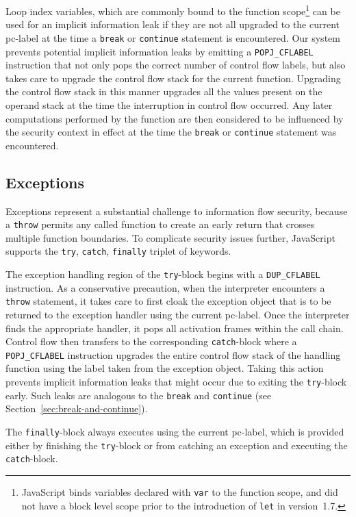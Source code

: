 \documentclass[preprint]{sigplanconf}
\begin{document}
Loop index variables, which are commonly bound to the function scope\footnote{JavaScript binds variables declared with \texttt{var} to the function scope, and did not have a block level scope prior to the introduction of \texttt{let} in version~1.7.} can be used for an implicit information leak if they are not all upgraded to the current pc-label at the time a \texttt{break} or \texttt{continue} statement is encountered.
Our system prevents potential implicit information leaks by emitting a \texttt{POPJ\_CFLABEL} instruction that not only pops the correct number of control flow labels, but also takes care to upgrade the control flow stack for the current function.
Upgrading the control flow stack in this manner upgrades all the values present on the operand stack at the time the interruption in control flow occurred.
Any later computations performed by the function are then considered to be influenced by the security context in effect at the time the \texttt{break} or \texttt{continue} statement was encountered.

\subsection{Exceptions}
\label{sec:exceptions}
Exceptions represent a substantial challenge to information flow security, because a \texttt{throw} permits any called function to create an early return that crosses multiple function boundaries.
To complicate security issues further, JavaScript supports the \texttt{try}, \texttt{catch}, \texttt{finally} triplet of keywords.

The exception handling region of the \texttt{try}-block begins with a \texttt{DUP\_CFLABEL} instruction.
As a conservative precaution, when the interpreter encounters a \texttt{throw} statement, it takes care to first cloak the exception object that is to be returned to the exception handler using the current pc-label.
Once the interpreter finds the appropriate handler, it pops all activation frames within the call chain.
Control flow then transfers to the corresponding \texttt{catch}-block where a \texttt{POPJ\_CFLABEL} instruction upgrades the entire control flow stack of the handling function using the label taken from the exception object.
Taking this action prevents implicit information leaks that might occur due to exiting the \texttt{try}-block early.
Such leaks are analogous to the \texttt{break} and \texttt{continue} (see Section~\ref{sec:break-and-continue}).

The \texttt{finally}-block always executes using the current pc-label, which is provided either by finishing the \texttt{try}-block or from catching an exception and executing the \texttt{catch}-block.
\end{document}
